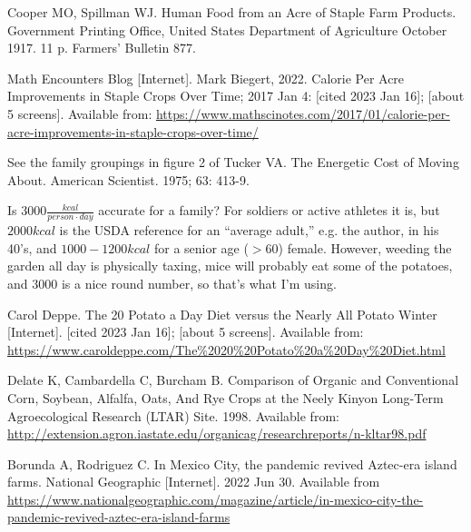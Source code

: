 \documentclass[12pt]{iopart}
\begin{document}
\begin{thebibliography}{99}
Cooper MO, Spillman WJ.
Human Food from an Acre of Staple Farm Products.
Government Printing Office, United States Department of Agriculture
October 1917.
11 p.
Farmers' Bulletin 877.



Math Encounters Blog [Internet].
Mark Biegert, 2022.
Calorie Per Acre Improvements in Staple Crops Over Time;
2017 Jan 4: [cited 2023 Jan 16]; [about 5 screens].
Available from: \url{https://www.mathscinotes.com/2017/01/calorie-per-acre-improvements-in-staple-crops-over-time/}



See the family groupings in figure 2 of 
Tucker VA.
The Energetic Cost of Moving About.
American Scientist.
1975; 
63: 413-9.

Is $3000\frac{kcal}{person\cdot day}$ accurate for a family?  For soldiers or active athletes it is, but $2000kcal$ is the USDA reference for an ``average adult,'' e.g. the author, in his 40's, and   $1000-1200kcal$ for a senior age ($>60$) female.  However, weeding the garden all day is physically taxing, mice will probably eat some of the potatoes, and $3000$ is a nice round number, so that's what I'm using.

Carol Deppe.
The 20 Potato a Day Diet versus the Nearly All Potato Winter [Internet].
[cited 2023 Jan 16]; [about 5 screens].
Available from: 
\url{https://www.caroldeppe.com/The\%2020\%20Potato\%20a\%20Day\%20Diet.html}


Delate K, Cambardella C, Burcham B.
Comparison of Organic and Conventional Corn, 
Soybean, Alfalfa, Oats, And Rye Crops at the Neely Kinyon Long-Term Agroecological Research (LTAR) Site.
1998.
Available from: \url{http://extension.agron.iastate.edu/organicag/researchreports/n-kltar98.pdf} 

Borunda A, Rodriguez C.
In Mexico City, the pandemic revived Aztec-era island farms.
National Geographic [Internet].
2022 Jun 30.
Available from \url{https://www.nationalgeographic.com/magazine/article/in-mexico-city-the-pandemic-revived-aztec-era-island-farms}


\end{thebibliography}
\end{document}
